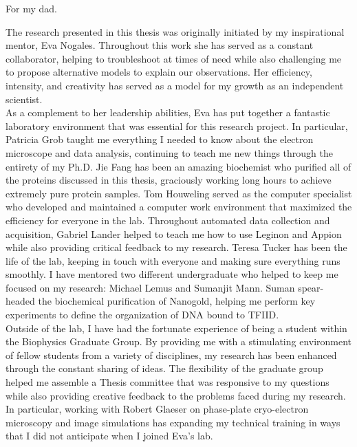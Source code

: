 \documentclass{ucbthesis}
\begin{document}
\begin{frontmatter}

\begin{dedication}
\null\vfil
\begin{center}
For my dad.
\end{center}
\vfil\null
\end{dedication}

\tableofcontents
\clearpage
\listoffigures
\clearpage


\begin{acknowledgements}
The research presented in this thesis was originally initiated by my inspirational mentor, Eva Nogales. Throughout this work she has served as a constant collaborator, helping to troubleshoot at times of need while also challenging me to propose alternative models to explain our observations. Her efficiency, intensity, and creativity has served as a model for my growth as an independent scientist.\\
\indent As a complement to her leadership abilities, Eva has put together a fantastic laboratory environment that was essential for this research project. In particular, Patricia Grob taught me everything I needed to know about the electron microscope and data analysis, continuing to teach me new things through the entirety of my Ph.D. Jie Fang has been an amazing biochemist who purified all of the proteins discussed in this thesis, graciously working long hours to achieve extremely pure protein samples. Tom Houweling served as the computer specialist who developed and maintained a computer work environment that maximized the efficiency for everyone in the lab. Throughout automated data collection and acquisition, Gabriel Lander helped to teach me how to use Leginon and Appion while also providing critical feedback to my research. Teresa Tucker has been the life of the lab, keeping in touch with everyone and making sure everything runs smoothly. I have mentored two different undergraduate who helped to keep me focused on my research: Michael Lemus and Sumanjit Mann. Suman spear-headed the biochemical purification of Nanogold, helping me perform key experiments to define the organization of DNA bound to TFIID.\\
\indent Outside of the lab, I have had the fortunate experience of being a student within the Biophysics Graduate Group. By providing me with a stimulating environment of fellow students from a variety of disciplines, my research has been enhanced through the constant sharing of ideas. The flexibility of the graduate group helped me assemble a Thesis committee that was responsive to my questions while also providing creative feedback to the problems faced during my research. In particular, working with Robert Glaeser on phase-plate cryo-electron microscopy and image simulations has expanding my technical training in ways that I did not anticipate when I joined Eva's lab.\\

\end{acknowledgements}
\end{frontmatter}
\end{document}
